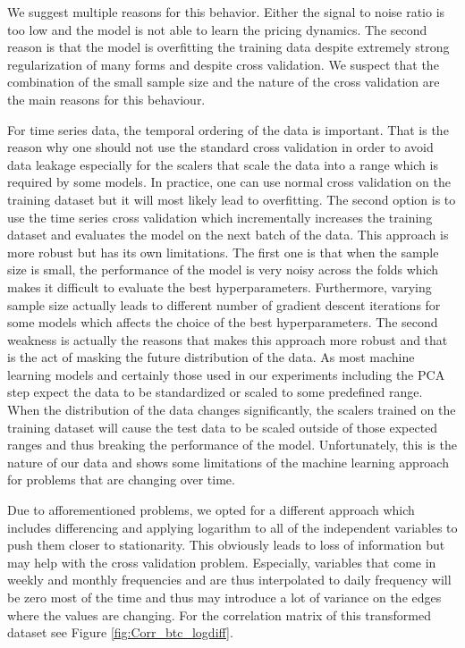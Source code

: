 We suggest multiple reasons for this behavior. 
Either the signal to noise ratio is too low
and the model is not able 
to learn the pricing dynamics. 
The second reason is that the model is overfitting the training
data despite extremely strong regularization of many forms and despite
cross validation. We suspect
that the combination of the small sample size and the
nature of the cross validation 
are the main reasons for this behaviour. 

For time series data, the temporal ordering of the data is important.
That is the reason why one should not use the standard cross validation
in order to avoid data leakage especially 
for the scalers that scale the data into a range
which is required by some models. In practice, 
one can use normal cross validation on the training dataset
but it will most likely lead to overfitting.
The second option is to use the time series cross validation
which incrementally increases the training dataset 
and evaluates the model on the next batch of the data.
This approach is more robust but has its own limitations.
The first one is that when the sample size is small, 
the performance of the model is very noisy across the folds
which makes it difficult to evaluate the best hyperparameters. 
Furthermore, varying sample size actually 
leads to different number of gradient descent iterations
for some models which affects the choice of the best hyperparameters.
The second weakness is actually the reasons
that makes this approach more robust and that is the
act of masking the future distribution of the data.
As most machine learning models and certainly 
those used in our experiments including the \ac{PCA} step
expect the data to be standardized
or scaled to some predefined range.
When the distribution of the data changes
significantly, the scalers trained on the training dataset
will cause the test data to be scaled
outside of those expected ranges and thus breaking the 
performance of the model. 
Unfortunately,
this is the nature of our data 
and shows some limitations of the machine learning approach 
for problems that are changing over time.


Due to afforementioned problems, we opted for a different approach
which includes differencing and applying logarithm to all of
the independent variables to push them closer to stationarity.
This obviously leads to loss of information 
but may help with the cross validation problem.
Especially, variables that come in weekly and monthly frequencies
and are thus interpolated to daily frequency
will be zero most of the time and thus
may introduce a lot of variance on the edges where the values
are changing. For the correlation matrix of this transformed 
dataset see Figure \ref{fig:Corr_btc_logdiff}.

